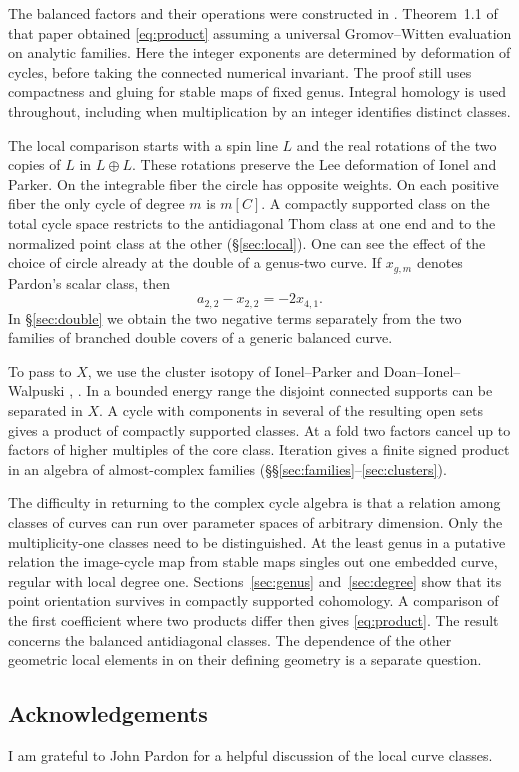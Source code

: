 The balanced factors and their operations were constructed in
\cite[\S\S2--3]{PaperIII}. Theorem~1.1 of that paper obtained
\eqref{eq:product} assuming a universal Gromov--Witten evaluation on
analytic families. Here the integer exponents are determined by
deformation of cycles, before taking the connected numerical invariant.
The proof still uses compactness and gluing for stable maps of fixed genus.
Integral homology is used throughout, including when multiplication by
an integer identifies distinct classes.

The local comparison starts with a spin line $L$ and the real rotations
of the two copies of $L$ in $L\oplus L$. These rotations preserve the
Lee deformation of Ionel and Parker. On the integrable fiber the
circle has opposite weights. On each positive fiber the only cycle of
degree $m$ is $m[C]$. A compactly supported class on the total cycle
space restricts to the antidiagonal Thom class at one end and to the
normalized point class at the other (\S\ref{sec:local}).
One can see the effect of the choice of circle already at the double of
a genus-two curve. If $x_{g,m}$ denotes Pardon's scalar class, then
\[
                      a_{2,2}-x_{2,2}=-2x_{4,1}.
\]
In \S\ref{sec:double} we obtain the two negative terms separately from
the two families of branched double covers of a generic balanced curve.

To pass to $X$, we use the cluster isotopy of Ionel--Parker and
Doan--Ionel--Walpuski \cite[\S7]{IP}, \cite[\S3]{DIW}. In a bounded
energy range the disjoint connected supports can be separated in $X$.
A cycle with components in several of the resulting open sets gives a
product of compactly supported classes. At a fold two factors cancel
up to factors of higher multiples of the core class. Iteration gives a
finite signed product in an algebra of almost-complex families
(\S\S\ref{sec:families}--\ref{sec:clusters}).

The difficulty in returning to the complex cycle algebra is that a
relation among classes of curves can run over parameter spaces of
arbitrary dimension. Only the multiplicity-one classes need to be
distinguished. At the least genus in a putative relation the image-cycle
map from stable maps singles out one embedded curve, regular with
local degree one. Sections~\ref{sec:genus} and~\ref{sec:degree} show
that its point orientation survives in compactly supported cohomology.
A comparison of the first coefficient where two products differ then
gives \eqref{eq:product}. The result concerns the balanced antidiagonal
classes. The dependence of the other geometric local elements in
\cite[Remark~6.8]{Pardon} on their defining geometry is a separate question.

\subsection*{Acknowledgements}
I am grateful to John Pardon for a helpful discussion of the local curve classes.
